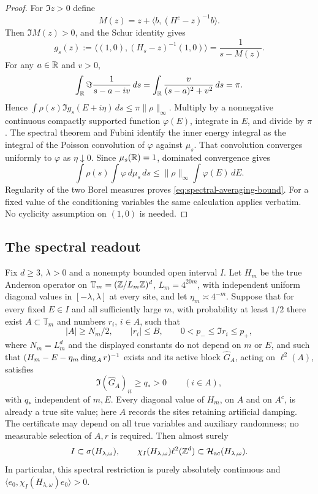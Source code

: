 \begin{proof}
For $\Im z>0$ define
\[
 M(z)=z+\langle b,(H^c-z)^{-1}b\rangle.
\]
Then $\Im M(z)>0$, and the Schur identity gives
\begin{equation}\label{eq:spectral-cavity}
 g_s(z):=\langle(1,0),(H_s-z)^{-1}(1,0)\rangle
       =\frac1{s-M(z)}.
\end{equation}
For any $a\in\mathbb R$ and $v>0$,
\[
 \int_{\mathbb R}\Im\frac1{s-a-iv}\,ds
 =\int_{\mathbb R}\frac{v}{(s-a)^2+v^2}\,ds=\pi.
\]
Hence $\int\rho(s)\Im g_s(E+i\eta)\,ds
\le\pi\|\rho\|_\infty$. Multiply by a nonnegative continuous
compactly supported function $\varphi(E)$, integrate in $E$, and
divide by $\pi$. The spectral theorem and Fubini identify the
inner energy integral as the integral of the Poisson convolution of
$\varphi$ against $\mu_s$. That convolution converges uniformly to
$\varphi$ as $\eta\downarrow0$. Since $\mu_s(\mathbb R)=1$, dominated
convergence gives
\[
 \int\rho(s)\int\varphi\,d\mu_s\,ds
 \le\|\rho\|_\infty\int\varphi(E)\,dE.
\]
Regularity of the two Borel measures proves
\eqref{eq:spectral-averaging-bound}. For a fixed value of the
conditioning variables the same calculation applies verbatim.
No cyclicity assumption on $(1,0)$ is needed.
\end{proof}

\subsection{The spectral readout}

\begin{proposition}\label{prop:certificate-readout}
Fix $d\ge3$, $\lambda>0$ and a nonempty bounded open interval $I$.
Let $H_m$ be the true Anderson operator on
$\mathbb T_m=(\mathbb Z/L_m\mathbb Z)^d$, $L_m=4^{20m}$, with independent
uniform diagonal values in $[-\lambda,\lambda]$ at every site,
and let $\eta_m\asymp4^{-m}$.
Suppose that for every fixed $E\in I$ and all sufficiently large
$m$, with probability at least $1/2$ there exist
$A\subset\mathbb T_m$ and numbers $r_i$, $i\in A$, such that
\[
 |A|\ge N_m/2,\qquad |r_i|\le B,\qquad
 0<p_-\le\Im r_i\le p_+,
\]
where $N_m=L_m^d$ and the displayed constants do not depend on
$m$ or $E$, and such that $(H_m-E-\eta_m\operatorname{diag}_A r)^{-1}$ exists
and its active block $\widehat G_A$, acting on $\ell^2(A)$, satisfies
\[
 \Im(\widehat G_A)_{ii}\ge q_*>0\qquad(i\in A),
\]
with $q_*$ independent of $m,E$. Every diagonal value of $H_m$, on
$A$ and on $A^c$, is already a true site value; here $A$ records the
sites retaining artificial damping. The certificate may depend on
all true variables and auxiliary randomness; no measurable
selection of $A,r$ is required. Then almost surely
\[
 I\subset\sigma(H_{\lambda,\omega}),\qquad
 \chi_I(H_{\lambda,\omega})\ell^2(\mathbb Z^d)
       \subset\mathcal H_{\mathrm{ac}}(H_{\lambda,\omega}).
\]
In particular, this spectral restriction is purely absolutely
continuous and $\langle e_0,\chi_I(H_{\lambda,\omega})e_0\rangle>0$.
\end{proposition}

